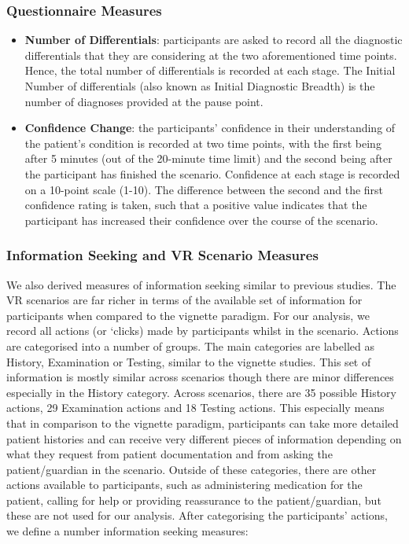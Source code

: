 \documentclass[a4paper, nobind]{templates/ociamthesis}
\begin{document}
\newpage

\subsubsection*{Questionnaire Measures}\label{questionnaire-measures}

\begin{itemize}
\item
  \textbf{Number of Differentials}: participants are asked to record all the diagnostic differentials that they are considering at the two aforementioned time points. Hence, the total number of differentials is recorded at each stage. The Initial Number of differentials (also known as Initial Diagnostic Breadth) is the number of diagnoses provided at the pause point.
\item
  \textbf{Confidence Change}: the participants' confidence in their understanding of the patient's condition is recorded at two time points, with the first being after 5 minutes (out of the 20-minute time limit) and the second being after the participant has finished the scenario. Confidence at each stage is recorded on a 10-point scale (1-10). The difference between the second and the first confidence rating is taken, such that a positive value indicates that the participant has increased their confidence over the course of the scenario.
\end{itemize}

\subsubsection*{Information Seeking and VR Scenario Measures}\label{information-seeking-and-vr-scenario-measures}

We also derived measures of information seeking similar to previous studies. The VR scenarios are far richer in terms of the available set of information for participants when compared to the vignette paradigm. For our analysis, we record all actions (or `clicks) made by participants whilst in the scenario. Actions are categorised into a number of groups. The main categories are labelled as History, Examination or Testing, similar to the vignette studies. This set of information is mostly similar across scenarios though there are minor differences especially in the History category. Across scenarios, there are 35 possible History actions, 29 Examination actions and 18 Testing actions. This especially means that in comparison to the vignette paradigm, participants can take more detailed patient histories and can receive very different pieces of information depending on what they request from patient documentation and from asking the patient/guardian in the scenario. Outside of these categories, there are other actions available to participants, such as administering medication for the patient, calling for help or providing reassurance to the patient/guardian, but these are not used for our analysis. After categorising the participants' actions, we define a number information seeking measures:
\end{document}
